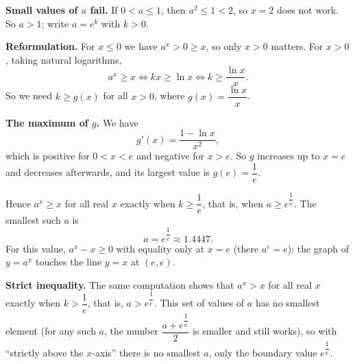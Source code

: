\textbf{Small values of $a$ fail.} If $0<a\le1$, then $a^2\le1<2$, so $x=2$ does not work. So $a>1$; write $a=e^k$ with $k>0$.

\textbf{Reformulation.} For $x\le0$ we have $a^x>0\ge x$, so only $x>0$ matters. For $x>0$, taking natural logarithms,
\[a^x\ge x\iff kx\ge\ln x\iff k\ge\dfrac{\ln x}{x}.\]
So we need $k\ge g(x)$ for all $x>0$, where $g(x)=\dfrac{\ln x}{x}$.

\textbf{The maximum of $g$.} We have
\[g'(x)=\dfrac{1-\ln x}{x^2},\]
which is positive for $0<x<e$ and negative for $x>e$. So $g$ increases up to $x=e$ and decreases afterwards, and its largest value is $g(e)=\dfrac1e$.

Hence $a^x\ge x$ for all real $x$ exactly when $k\ge\dfrac1e$, that is, when $a\ge e^{\dfrac1e}$. The smallest such $a$ is
\[a=\boxed{e^{\dfrac1e}}\approx1.4447.\]
For this value, $a^x-x\ge0$ with equality only at $x=e$ (there $a^e=e$): the graph of $y=a^x$ touches the line $y=x$ at $(e,e)$.

\textbf{Strict inequality.} The same computation shows that $a^x>x$ for all real $x$ exactly when $k>\dfrac1e$, that is, $a>e^{\dfrac1e}$. This set of values of $a$ has no smallest element (for any such $a$, the number $\dfrac{a+e^{\dfrac1e}}{2}$ is smaller and still works), so with ``strictly above the $x$-axis'' there is no smallest $a$, only the boundary value $e^{\dfrac1e}$.
